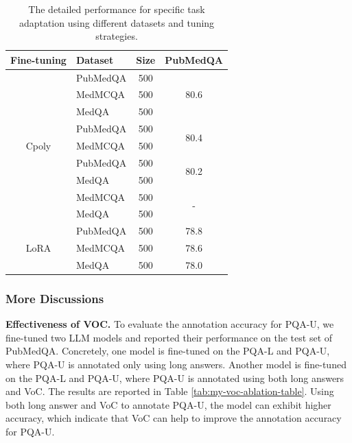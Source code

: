 \documentclass{article} %
\begin{document}
\begin{table}[!t]
\centering
\caption{The detailed performance for specific task adaptation using different datasets and tuning strategies.}
\label{tab:my-dataset-ablation-table}
\begin{tabular}{@{}clcc@{}}
\toprule
\textbf{Fine-tuning} & \textbf{Dataset} & \textbf{Size} & \textbf{PubMedQA} \\ \midrule
\multirow{9}{*}{Cpoly} & PubMedQA & 500 & \multirow{3}{*}{80.6} \\ 
                       & MedMCQA  & 500 &                       \\
                       & MedQA    & 500 &                       \\ \cmidrule{2-4}
                       & PubMedQA & 500 & \multirow{2}{*}{80.4} \\ 
                       & MedMCQA  & 500 &                       \\ \cmidrule{2-4}
                       & PubMedQA & 500 & \multirow{2}{*}{80.2} \\ 
                       & MedQA    & 500 &                       \\ \cmidrule{2-4}
                       & MedMCQA  & 500 & \multirow{2}{*}{-}    \\
                       & MedQA    & 500 &                       \\ \midrule
\multirow{3}{*}{LoRA}  & PubMedQA & 500 & 78.8  \\ \cmidrule{2-4}
                       & MedMCQA  & 500 & 78.6  \\ \cmidrule{2-4}
                       & MedQA    & 500 & 78.0  \\ \bottomrule
\end{tabular}
\end{table}

\subsubsection{More Discussions}
\textbf{Effectiveness of VOC.} \label{ablation_voc} To evaluate the annotation accuracy for PQA-U, we fine-tuned two LLM models and reported their performance on the test set of PubMedQA. Concretely, one model is fine-tuned on the PQA-L and PQA-U, where PQA-U is annotated only using long answers. Another model is fine-tuned on the PQA-L and PQA-U, where PQA-U is annotated using both long answers and VoC. The results are reported in Table \ref{tab:my-voc-ablation-table}. Using both long answer and VoC to annotate PQA-U, the model can exhibit higher accuracy, which indicate that VoC can help to improve the annotation accuracy for PQA-U.
\end{document}
